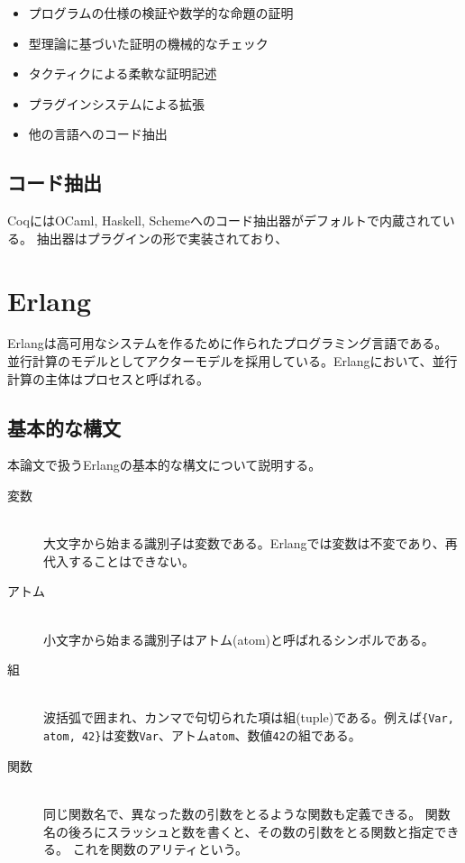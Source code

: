 \begin{itemize}
\item プログラムの仕様の検証や数学的な命題の証明
\item 型理論に基づいた証明の機械的なチェック
\item タクティクによる柔軟な証明記述
\item プラグインシステムによる拡張
\item 他の言語へのコード抽出
\end{itemize}

\subsection{コード抽出}

CoqにはOCaml, Haskell, Schemeへのコード抽出器がデフォルトで内蔵されている。
抽出器はプラグインの形で実装されており、

\section{Erlang}

Erlang\cite{erlang}は高可用なシステムを作るために作られたプログラミング言語である。
並行計算のモデルとしてアクターモデルを採用している。Erlangにおいて、並行計算の主体はプロセスと呼ばれる。

\subsection{基本的な構文}

本論文で扱うErlangの基本的な構文について説明する。

\begin{description}
\item[変数]\mbox{}\\
  大文字から始まる識別子は変数である。Erlangでは変数は不変であり、再代入することはできない。
\item[アトム]\mbox{}\\
  小文字から始まる識別子はアトム(atom)と呼ばれるシンボルである。
\item[組]\mbox{}\\
  波括弧で囲まれ、カンマで句切られた項は組(tuple)である。例えば\lstinline|{Var, atom, 42}|は変数\lstinline{Var}、アトム\lstinline{atom}、数値\lstinline{42}の組である。
\item[関数]\mbox{}\\
  同じ関数名で、異なった数の引数をとるような関数も定義できる。
  関数名の後ろにスラッシュと数を書くと、その数の引数をとる関数と指定できる。
  これを関数のアリティという。
\end{description}

